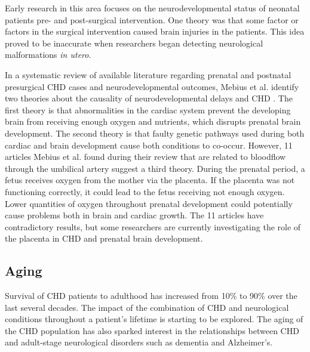 Early research in this area focuses on the neurodevelopmental status of neonatal patients pre- and post-surgical intervention. One theory was that some factor or factors in the surgical intervention caused brain injuries in the patients. This idea proved to be inaccurate when researchers began detecting neurological malformations \textit{in utero}.

In a systematic review of available literature regarding prenatal and postnatal presurgical CHD cases and neurodevelopmental outcomes, Mebius et al. identify two theories about the causality of  neurodevelopmental delays and CHD \cite{Mebius2017}. The first theory is that abnormalities in the cardiac system prevent the developing brain from receiving enough oxygen and nutrients, which disrupts prenatal brain development. The second theory is that faulty genetic pathways used during both cardiac and brain development cause both conditions to co-occur. However, 11 articles Mebius et al. found during their review that are related to bloodflow through the umbilical artery suggest a third theory. During the prenatal period, a fetus receives oxygen from the mother via the placenta. If the placenta was not functioning correctly, it could lead to the fetus receiving not enough oxygen. Lower quantities of oxygen throughout prenatal development could potentially cause problems both in brain and cardiac growth. The 11 articles have contradictory results, but some researchers are currently investigating the role of the placenta in CHD and prenatal brain development.


\subsection{Aging}

Survival of CHD patients to adulthood has increased from 10\% to 90\% over the last several decades. The impact of the combination of CHD and neurological conditions throughout a patient's lifetime is starting to be explored. The aging of the CHD population has also sparked interest in the relationships between CHD and adult-stage neurological disorders such as dementia and Alzheimer's. 


